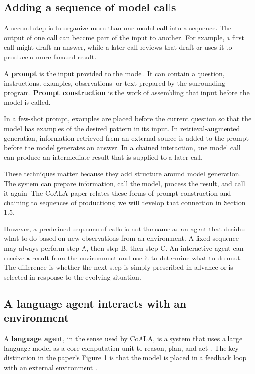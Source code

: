 \subsection{Adding a sequence of model calls}\label{adding-a-sequence-of-model-calls}

A second step is to organize more than one model call into a sequence. The output of one call can become part of the input to another. For example, a first call might draft an answer, while a later call reviews that draft or uses it to produce a more focused result.

A \textbf{prompt} is the input provided to the model. It can contain a question, instructions, examples, observations, or text prepared by the surrounding program. \textbf{Prompt construction} is the work of assembling that input before the model is called.

In a few-shot prompt, examples are placed before the current question so that the model has examples of the desired pattern in its input. In retrieval-augmented generation, information retrieved from an external source is added to the prompt before the model generates an answer. In a chained interaction, one model call can produce an intermediate result that is supplied to a later call.

These techniques matter because they add structure around model generation. The system can prepare information, call the model, process the result, and call it again. The CoALA paper relates these forms of prompt construction and chaining to sequences of productions; we will develop that connection in Section 1.5.

However, a predefined sequence of calls is not the same as an agent that decides what to do based on new observations from an environment. A fixed sequence may always perform step A, then step B, then step C. An interactive agent can receive a result from the environment and use it to determine what to do next. The difference is whether the next step is simply prescribed in advance or is selected in response to the evolving situation.

\subsection{A language agent interacts with an environment}\label{a-language-agent-interacts-with-an-environment}

A \textbf{language agent}, in the sense used by CoALA, is a system that uses a large language model as a core computation unit to reason, plan, and act . The key distinction in the paper's Figure 1 is that the model is placed in a feedback loop with an external environment .

